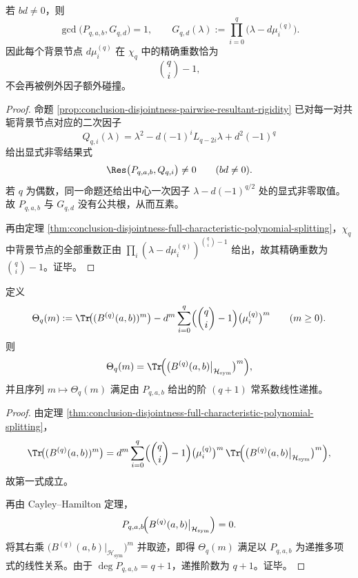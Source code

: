 \begin{corollary}[背景节点与例外节点的严格分离]\label{cor:conclusion-disjointness-background-exceptional-coprime-separation}
若 \(bd\neq 0\)，则
\[
\gcd\!\bigl(P_{q,a,b},G_{q,d}\bigr)=1,
\qquad
G_{q,d}(\lambda):=\prod_{i=0}^{q}\bigl(\lambda-d\mu_i^{(q)}\bigr).
\]
因此每个背景节点 \(d\mu_i^{(q)}\) 在 \(\chi_q\) 中的精确重数恰为
\[
\binom qi-1,
\]
不会再被例外因子额外碰撞。
\end{corollary}
\begin{proof}
命题 \ref{prop:conclusion-disjointness-pairwise-resultant-rigidity} 已对每一对共轭背景节点对应的二次因子
\[
Q_{q,i}(\lambda)=\lambda^2-d(-1)^iL_{q-2i}\lambda+d^2(-1)^q
\]
给出显式非零结果式
\[
\Res\bigl(P_{q,a,b},Q_{q,i}\bigr)\neq 0
\qquad (bd\neq 0).
\]
若 \(q\) 为偶数，同一命题还给出中心一次因子 \(\lambda-d(-1)^{q/2}\) 处的显式非零取值。故 \(P_{q,a,b}\) 与 \(G_{q,d}\) 没有公共根，从而互素。

再由定理 \ref{thm:conclusion-disjointness-full-characteristic-polynomial-splitting}，\(\chi_q\) 中背景节点的全部重数正由 \(\prod_i(\lambda-d\mu_i^{(q)})^{\binom qi-1}\) 给出，故其精确重数为 \(\binom qi-1\)。证毕。
\end{proof}

\begin{theorem}\label{thm:conclusion-disjointness-exceptional-trace-moment-recurrence}
定义
\[
\Theta_q(m):=
\Tr\!\bigl((B^{(q)}(a,b))^m\bigr)
-d^m\sum_{i=0}^{q}\Bigl(\binom qi-1\Bigr)\bigl(\mu_i^{(q)}\bigr)^m
\qquad (m\ge 0).
\]
则
\[
\Theta_q(m)=\Tr\!\Bigl(\bigl(B^{(q)}(a,b)\big|_{\mathcal H_{\mathrm{sym}}}\bigr)^m\Bigr),
\]
并且序列 \(m\mapsto \Theta_q(m)\) 满足由 \(P_{q,a,b}\) 给出的阶 \((q+1)\) 常系数线性递推。
\end{theorem}
\begin{proof}
由定理 \ref{thm:conclusion-disjointness-full-characteristic-polynomial-splitting}，
\[
\Tr\!\bigl((B^{(q)}(a,b))^m\bigr)
=
d^m\sum_{i=0}^{q}\Bigl(\binom qi-1\Bigr)\bigl(\mu_i^{(q)}\bigr)^m
\,
\Tr\!\Bigl(\bigl(B^{(q)}(a,b)\big|_{\mathcal H_{\mathrm{sym}}}\bigr)^m\Bigr),
\]
故第一式成立。

再由 Cayley--Hamilton 定理，
\[
P_{q,a,b}\!\Bigl(B^{(q)}(a,b)\big|_{\mathcal H_{\mathrm{sym}}}\Bigr)=0.
\]
将其右乘 \(\bigl(B^{(q)}(a,b)\big|_{\mathcal H_{\mathrm{sym}}}\bigr)^m\) 并取迹，即得 \(\Theta_q(m)\) 满足以 \(P_{q,a,b}\) 为递推多项式的线性关系。由于 \(\deg P_{q,a,b}=q+1\)，递推阶数为 \(q+1\)。证毕。
\end{proof}

